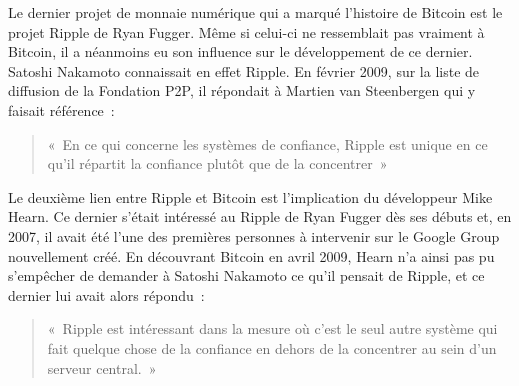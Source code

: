 Le dernier projet de monnaie numérique qui a marqué l'histoire de Bitcoin est le projet Ripple de Ryan Fugger. Même si celui-ci ne ressemblait pas vraiment à Bitcoin, il a néanmoins eu son influence sur le développement de ce dernier. Satoshi Nakamoto connaissait en effet Ripple. En février 2009, sur la liste de diffusion de la Fondation P2P, il répondait à Martien van Steenbergen qui y faisait référence~:

\begin{quote}
«~En ce qui concerne les systèmes de confiance, Ripple est unique en ce qu'il répartit la confiance plutôt que de la concentrer~»
\end{quote}

Le deuxième lien entre Ripple et Bitcoin est l'implication du développeur Mike Hearn. Ce dernier s'était intéressé au Ripple de Ryan Fugger dès ses débuts et, en 2007, il avait été l'une des premières personnes à intervenir sur le Google Group nouvellement créé. En découvrant Bitcoin en avril 2009, Hearn n'a ainsi pas pu s'empêcher de demander à Satoshi Nakamoto ce qu'il pensait de Ripple, et ce dernier lui avait alors répondu~:

\begin{quote}
«~Ripple est intéressant dans la mesure où c'est le seul autre système qui fait quelque chose de la confiance en dehors de la concentrer au sein d'un serveur central.~»
\end{quote}


